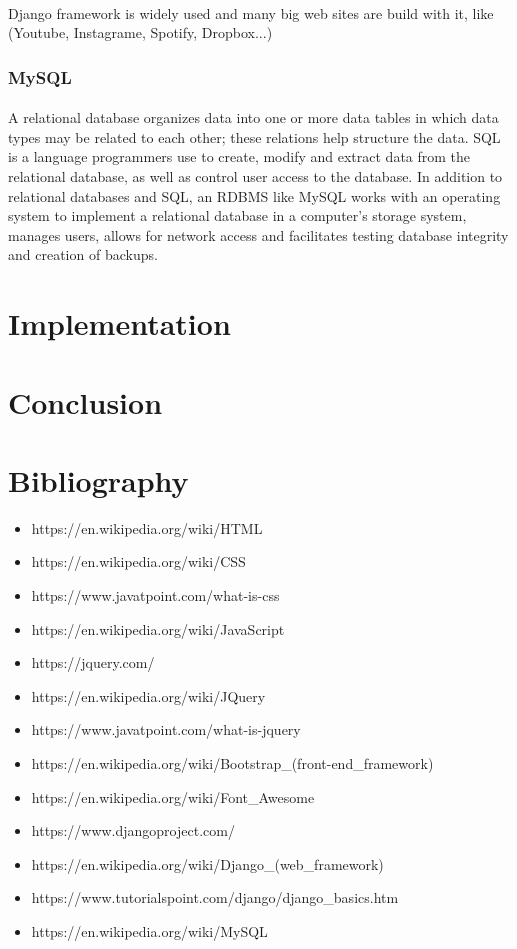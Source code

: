 \documentclass{article}
\begin{document}
	\paragraph{}
	Django framework is widely used and many big web sites are build with it, like (Youtube, Instagrame, Spotify, Dropbox...)
	\subsubsection{MySQL}
	\paragraph{}
	 A relational database organizes data into one or more data tables in which data types may be related to each other; these relations help structure the data. SQL is a language programmers use to create, modify and extract data from the relational database, as well as control user access to the database. In addition to relational databases and SQL, an RDBMS like MySQL works with an operating system to implement a relational database in a computer's storage system, manages users, allows for network access and facilitates testing database integrity and creation of backups.
	\section{Implementation}
	\section{Conclusion}
	\newpage
	\section{Bibliography}
	\begin{itemize}
		\item https://en.wikipedia.org/wiki/HTML
		\item https://en.wikipedia.org/wiki/CSS
		\item https://www.javatpoint.com/what-is-css
		\item https://en.wikipedia.org/wiki/JavaScript
		\item https://jquery.com/
		\item https://en.wikipedia.org/wiki/JQuery
		\item https://www.javatpoint.com/what-is-jquery
		\item https://en.wikipedia.org/wiki/Bootstrap\_(front-end\_framework)
		\item https://en.wikipedia.org/wiki/Font\_Awesome
		\item https://www.djangoproject.com/
		\item https://en.wikipedia.org/wiki/Django\_(web\_framework)
		\item https://www.tutorialspoint.com/django/django\_basics.htm
		\item https://en.wikipedia.org/wiki/MySQL
	\end{itemize}
\end{document}
